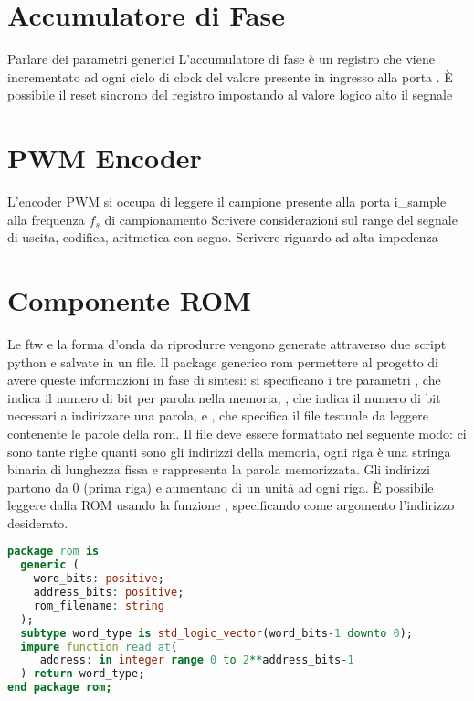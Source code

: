 \section{Accumulatore di Fase}
\label{sec:phaseaccumulator}

\begin{center}
\end{center}
Parlare dei parametri generici
L'accumulatore di fase è un registro che viene incrementato ad ogni ciclo di clock del valore presente in ingresso alla porta .
È possibile il reset sincrono del registro impostando al valore logico alto il segnale 

\section{PWM Encoder}
\label{sec:pwmencoder}

\begin{center}
\end{center}
L'encoder PWM si occupa di leggere il campione presente alla porta i\_sample alla frequenza $f_s$ di campionamento
Scrivere considerazioni sul range del segnale di uscita, codifica, aritmetica con segno.
Scrivere riguardo ad alta impedenza

\section{Componente ROM}
\label{sec:rom}
Le ftw e la forma d'onda da riprodurre vengono generate attraverso due
script python e salvate in un file.
Il package generico rom permettere al progetto di avere queste informazioni in fase di sintesi: si specificano i tre parametri , che indica il numero di bit per parola nella memoria, , che indica il numero di bit necessari a indirizzare una parola, e , che specifica il file testuale da leggere contenente le parole della rom.
Il file deve essere formattato nel seguente modo: ci sono tante righe quanti sono gli indirizzi della memoria, ogni riga è una stringa binaria
di lunghezza fissa e rappresenta la parola memorizzata.
Gli indirizzi partono da 0 (prima riga) e aumentano di un unità ad ogni riga.
È possibile leggere dalla ROM usando la funzione , specificando come argomento l'indirizzo desiderato.
\begin{lstlisting}[language=VHDL]
package rom is
  generic (
    word_bits: positive;
    address_bits: positive;
    rom_filename: string
  );
  subtype word_type is std_logic_vector(word_bits-1 downto 0);
  impure function read_at(
     address: in integer range 0 to 2**address_bits-1
  ) return word_type;
end package rom;
\end{lstlisting}

